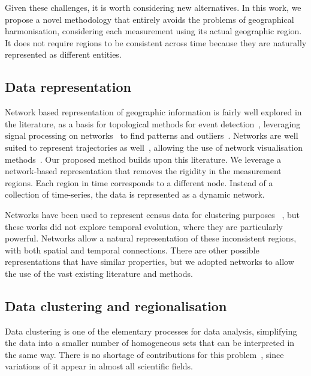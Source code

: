 Given these challenges, it is worth considering new alternatives. In this work,
we propose a novel methodology that entirely avoids the problems of geographical
harmonisation, considering each measurement using its actual geographic region.
It does not require regions to be consistent across time because they are
naturally represented as different entities. 

\subsection{Data representation}

Network based representation of geographic information is fairly well explored
in the literature, as a basis for topological methods for event
detection~\citep{Doraiswamy2014}, leveraging signal processing on
networks~\citep{shuman2013emerging,sandryhaila2013discrete} to find patterns and
outliers~\citep{Valdivia2015,Dias2015,Alce2018}. Networks are well suited to
represent trajectories as
well~\citep{VonLandesberger2016,Huang2016,chen2015survey}, allowing the use of
network visualisation methods~\citep{Vehlow2015,Beck2014}. Our proposed method
builds upon this literature. We leverage a network-based representation that
removes the rigidity in the measurement regions. Each region in time corresponds
to a different node. Instead of a collection of time-series, the data is
represented as a dynamic network. 

Networks have been used to represent census data for clustering purposes
~\citep{Dias2015,Setiadi2017}, but these works did not explore temporal
evolution, where they are particularly powerful. Networks allow a natural
representation of these inconsistent regions, with both spatial and temporal
connections. There are other possible representations that have similar
properties, but we adopted networks to allow the use of the vast existing
literature and methods.


\subsection{Data clustering and regionalisation}

Data clustering is one of the elementary processes for data analysis,
simplifying the data into a smaller number of homogeneous sets that can be
interpreted in the same way. There is no shortage of contributions for this
problem~\citep{Fahad2014}, since variations of it appear in almost all
scientific fields.


